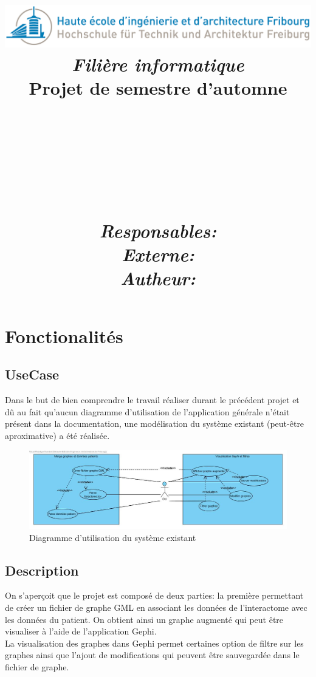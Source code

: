 \documentclass{article}
\title{
  \includegraphics[width=0.9\columnwidth]{Logo_HEIA}\\
  \vspace{1cm}
  \textmd{\textit{Filière informatique}} \\
  \vspace{2cm}
  \textmd{Projet de semestre d'automne}\\
  \textmd{\projDate}\\
  \vspace{1.5cm}
  \noindent\makebox[\linewidth]{\rule{\textwidth}{0.5pt}}\\
  \vspace{.5cm}
  \textmd{\textbf{\projName}}\\
  \textmd{\textbf{\docTitle}}\\
  \noindent\makebox[\linewidth]{\rule{\textwidth}{0.5pt}}\\
  \Large
  \vspace{3cm}
  \textit{Responsables:} \projSupervisors \\
  \vspace{1cm}
  \textit{Externe:} \projInitiator \\
  \vspace{1cm}
  \textit{Autheur:} \projAuthorName \\
  \author{}
}
\date{} %
\begin{document}
\maketitle


 \newpage



\section{Fonctionalités}
\subsection{UseCase}
Dans le but de bien comprendre le travail réaliser durant le précédent projet et dû au fait qu'aucun
diagramme d'utilisation de l'application générale n'était présent dans la documentation, une modélisation
du système existant (peut-être aproximative) a été réalisée.
\begin{figure}[!h]
  \center
  \includegraphics[width=\textwidth]{VisuDNA_UC}
  \caption{Diagramme d'utilisation du système existant}
\end{figure}

\subsection{Description}
On s'aperçoit que le projet est composé de deux parties: la première permettant de créer un fichier de graphe GML en associant les données de l'interactome avec les données du patient. On obtient ainsi un graphe augmenté qui peut être visualiser à l'aide de l'application Gephi.\\
La visualisation des graphes dans Gephi permet certaines option de filtre sur les graphes ainsi que l'ajout de modifications qui peuvent être sauvegardée dans le fichier de graphe.
\end{document}
